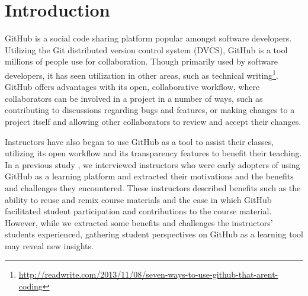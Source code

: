 \section{Introduction}


GitHub is a social code sharing platform popular amongst software developers. Utilizing the Git distributed version control system (DVCS), GitHub is a tool millions of people use for collaboration. Though primarily used by software developers, it has seen utilization in other areas, such as technical writing\footnote{\url{http://readwrite.com/2013/11/08/seven-ways-to-use-github-that-arent-coding}}. GitHub offers advantages with its open, collaborative workflow, where collaborators can be involved in a project in a number of ways, such as contributing to discussions regarding bugs and features, or making changes to a project itself and allowing other collaborators to review and accept their changes.

Instructors have also began to use GitHub as a tool to assist their classes, utilizing its open workflow and its transparency features to benefit their teaching. In a previous study \cite{Zagalsky}, we interviewed instructors who were early adopters of using GitHub as a learning platform and extracted their motivations and the benefits and challenges they encountered. These instructors described benefits such as the ability to reuse and remix course materials and the ease in which GitHub facilitated student participation and contributions to the course material. However, while we extracted some benefits and challenges the instructors' students experienced, gathering student perspectives on GitHub as a learning tool may reveal new insights.



